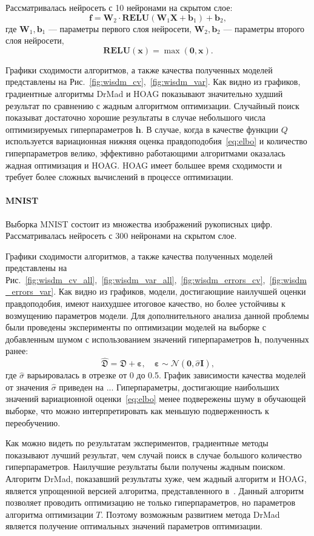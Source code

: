 \documentclass[12pt]{article}
\begin{document}
Рассматривалась нейросеть с 10 нейронами на скрытом слое:
\[
    \mathbf{f} = \mathbf{W}_2 \cdot \textbf{RELU}(\mathbf{W}_1\mathbf{X} + \mathbf{b}_1) +\mathbf{b}_2,
\]
где $\mathbf{W}_1, \mathbf{b}_1$ --- параметры первого слоя нейросети,
$\mathbf{W}_2, \mathbf{b}_2$ --- параметры второго слоя нейросети,
\[
    \textbf{RELU}(\mathbf{x}) = \max(\mathbf{0}, \mathbf{x}).
\]

Графики сходимости алгоритмов, а также качества полученных моделей представлены на Рис.~\ref{fig:wisdm_cv},~\ref{fig:wisdm_var}.
Как видно из графиков, градиентные алгоритмы DrMad и HOAG показывают значительно худший результат по сравнению с жадным алгоритмом оптимизации. Случайный поиск показыват достаточно хорошие результаты в случае небольшого числа оптимизируемых гиперпараметров $\mathbf{h}$. В случае, когда в качестве функции $Q$ используется вариационная нижняя оценка правдоподобия~\eqref{eq:elbo} и количество гиперпараметров велико, эффективно работающими алгоритмами оказалась жадная оптимизация и HOAG. HOAG имеет большее время сходимости и требует более сложных вычислений в процессе оптимизации.


\paragraph{MNIST}
Выборка MNIST состоит из множества изображений рукописных цифр.
Рассматривалась нейросеть с 300 нейронами на скрытом слое.

Графики сходимости алгоритмов, а также качества полученных моделей представлены на Рис.~\ref{fig:wisdm_cv_all},~\ref{fig:wisdm_var_all},~\ref{fig:wisdm_errors_cv},~\ref{fig:wisdm_errors_var}.
Как видно из графиков, модели, достигающиие наилучшей оценки правдоподобия, имеют наихудшее итоговое качество, но более устойчивы к возмущению параметров модели. Для дополнительного анализа данной проблемы были проведены эксперименты по оптимизации моделей на выборке с добавленным шумом с использованием значений гиперпараметров $\mathbf{h}$, полученных ранее:
\[
    \hat{\mathfrak{D}} = \mathfrak{D} + \boldsymbol{\varepsilon}, \quad   \boldsymbol{\varepsilon} \sim \mathcal{N}(\mathbf{0}, \hat{\sigma}\mathbf{I}),
\]
где $\hat{\sigma}$ варьировалась в отрезке от 0 до 0.5.
График зависимости качества моделей от значения $\hat{\sigma}$ приведен на ... Гиперпараметры, достигающие наибольших значений вариационной оценки~\eqref{eq:elbo} менее подвережены шуму в обучающей выборке, что можно интерпретировать как меньшую подверженность к переобучению.

Как можно видеть по результатам экспериментов, градиентные методы показывают лучший результат, чем случай поиск в случае большого количество гиперпараметров. Наилучшие результаты были получены жадным поиском. Алгоритм DrMad, показавший результаты хуже, чем жадный алгоритм и HOAG, является упрощенной версией алгоритма, представленного в~\cite{hyper_mad}. Данный алгоритм позволяет проводить оптимизацию не только гиперпараметров, но параметров алгоритма оптимизации $T$. Поэтому возможным развитием  метода DrMad является получение оптимальных значений параметров оптимизации.
\end{document}
